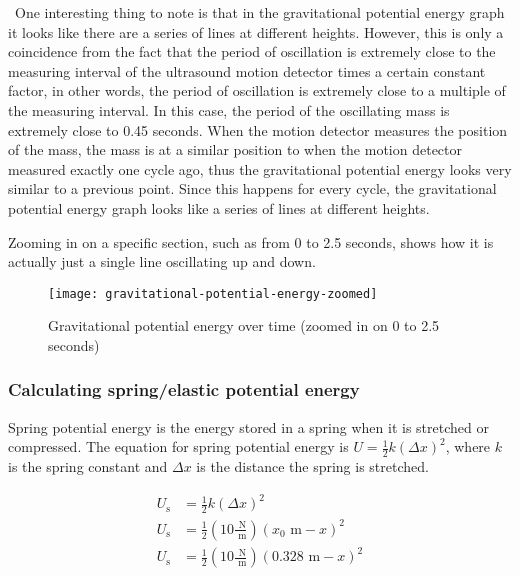 \documentclass{article}
\begin{document}
                ~One interesting thing to note is that in the gravitational potential energy graph it looks like there are a series of lines at different heights.
                However, this is only a coincidence from the fact that the period of oscillation is extremely close to the measuring interval of the ultrasound motion detector times a certain constant factor, in other words, the period of oscillation is extremely close to a multiple of the measuring interval.
                In this case, the period of the oscillating mass is extremely close to 0.45 seconds.
                When the motion detector measures the position of the mass, the mass is at a similar position to when the motion detector measured exactly one cycle ago, thus the gravitational potential energy looks very similar to a previous point.
                Since this happens for every cycle, the gravitational potential energy graph looks like a series of lines at different heights.
                
                Zooming in on a specific section, such as from 0 to 2.5 seconds, shows how it is actually just a single line oscillating up and down.
                
                \begin{figure}[H]
                    \centering
                    \texttt{[image: gravitational-potential-energy-zoomed]}
                    \caption{Gravitational potential energy over time (zoomed in on 0 to 2.5 seconds)}
                    \label{fig:gravitational-potential-energy-zoomed}
                \end{figure}
            
            \subsubsection{Calculating spring/elastic potential energy}
                Spring potential energy is the energy stored in a spring when it is stretched or compressed.
                The equation for spring potential energy is $U = \frac{1}{2}k(\Delta x)^2$, where $k$ is the spring constant and $\Delta x$ is the distance the spring is stretched.
                
                \begin{equation}
                    \begin{aligned}
                        U_{\text{s}} &= \frac{1}{2}k(\Delta x)^2 \\
                        U_{\text{s}} &= \frac{1}{2}(10 \frac{\text{ N}}{\text{ m}})(x_0 \text{ m} - x)^2 \\
                        U_{\text{s}} &= \frac{1}{2}(10 \frac{\text{ N}}{\text{ m}})(0.328 \text{ m} - x)^2 \\
                    \end{aligned}\label{eq:spring-potential-energy-equation}
                \end{equation}
                
\end{document}
